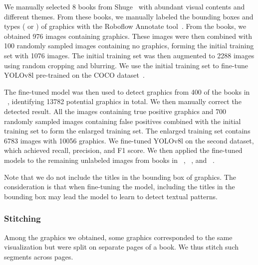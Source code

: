 We manually selected 8 books from Shuge~\cite{Ceng2013Shuge} with abundant visual contents and different themes.
From these books, we manually labeled the bounding boxes and types ( or ) of graphics with the Roboflow Annotate tool~\cite{RoboflowRoboflow}.
From the books, we obtained 976 images containing graphics.
These images were then combined with \num{100} randomly sampled images containing no graphics, forming the initial training set with \num{1076} images.
The initial training set was then augmented to \num{2288} images using random cropping and blurring.
We use the initial training set to fine-tune YOLOv8l pre-trained on the COCO dataset~\cite{Lin2014Microsoft}.

The fine-tuned model was then used to detect graphics from \num{400} of the books in ~\cite{LibraryCongressLibrary}, identifying \num{13782} potential graphics in total.
We then manually correct the detected result.
All the images containing true positive graphics and \num{700} randomly sampled images containing false positives combined with the initial training set to form the enlarged training set.
The enlarged training set contains \num{6783} images with \num{10056} graphics.
We fine-tuned YOLOv8l on the second dataset, which achieved \recall recall, \precision precision, and \Fone F1 score.
We then applied the fine-tuned models to the remaining unlabeled images from books in ~\cite{LibraryCongressLibrary}, ~\cite{HarvardLibrary2023Harvard}, and ~\cite{NDLRare}.

Note that we do not include the titles in the bounding box of graphics.
The consideration is that when fine-tuning the model, including the titles in the bounding box may lead the model to learn to detect textual patterns.

\subsubsection{Stitching}
\label{sec:stitching}

Among the graphics we obtained, some graphics corresponded to the same visualization but were split on separate pages of a book.
We thus stitch such segments across pages.



